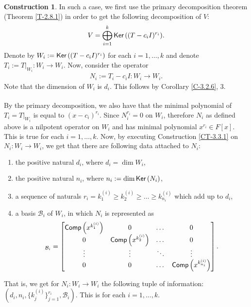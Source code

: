 \documentclass[letterpaper,11pt,twoside]{article}
\theoremstyle{definition}
\theoremstyle{definition}
\theoremstyle{definition}
\theoremstyle{definition}
\theoremstyle{definition}
\newtheorem{construct}[proposition]{\textbf{Construction}}
\theoremstyle{definition}
\theoremstyle{remark}
\theoremstyle{definition}
\newcommand{\Ker}[1]{{\fontfamily{lmss}\selectfont 
		\text{Ker}\left (#1\right )
}}
\newcommand{\rest}[2]{\left. { #1 }\right \vert_{#2}}
\newcommand{\Comp}[1]{{\fontfamily{lmss}\selectfont 
            \text{Comp}\left(#1\right)
}}
\begin{document}
\begin{construct}
	In such a case, we first use the primary decomposition theorem (Theorem \ref{T-2.8.1}) in order to get the following decomposition of $ V $:
	\begin{align*}
		V = \bigoplus_{i=1}^{k} \Ker{(T-c_iI)^{r_{i}}}.
	\end{align*}
	Denote by $ W_i := \Ker{(T-c_iI)^{r_{i}}} $ for each $ i=1,\dots,k $ and denote $ T_i:= \rest{T}{W_i} : W_i\to W_i $. Now, consider the operator
	\begin{align*}
		N_i := T_i -c_iI : W_i \to W_i.
	\end{align*}
	Note that the dimension of $ W_i $ is $ d_i $. This follows by Corollary \ref{C-3.2.6}, 3.\\\\
	By the primary decomposition, we also have that the minimal polynomial of $ T_i = \rest{T}{W_i} $ is equal to $ (x-c_i)^{r_i} $. Since $ N_i^{r_i} = 0 $ on $ W_i $, therefore $ N_i $ as defined above is a nilpotent operator on $ W_i $ and has minimal polynomial $ x^{r_i} \in F[x] $. This is true for each $ i=1,\dots,k $. Now, by executing Construction \ref{CT-3.3.1} on $ N_i : W_i\to W_i $, we get that there are following data attached to $ N_i $:
	\begin{enumerate}
		\item {the positive natural $ d_i $, where $ d_i = \dim W_i $,}
		\item {the positive natural $ n_i $, where $ n_i :=  \dim \Ker{N_i}$,}
		\item {a sequence of naturals $ r_i = k^{(i)}_1\ge k^{(i)}_2\ge \dots \ge k^{(i)}_{n_i} $ which add up to $ d_i $,}
		\item {a basis $ \mathcal{B}_i $ of $ W_i $, in which $ N_i $ is represented as
	\begin{align*}
		[N_i]_{\mathcal{B}_i} =  \begin{bmatrix}
			\Comp{x^{k^{(i)}_1}} & 0 & \dots & 0\\
			0 & \Comp{x^{k^{(i)}_2}} & \dots & 0\\
			\vdots & \vdots & \ddots & \vdots \\
			0 & 0 & \dots & \Comp{x^{k^{(i)}_{n_i}}}
		\end{bmatrix}.
	\end{align*}
	}
	\end{enumerate}
	That is, we get for $ N_i : W_i\to W_i $ the following tuple of information: $ (d_i,n_i,\{k^{(i)}_{j}\}_{j=1}^{r_i}, \mathcal{B}_i) $. This is for each $ i =1,\dots,k $.\\
	

\end{construct}
\end{document}
